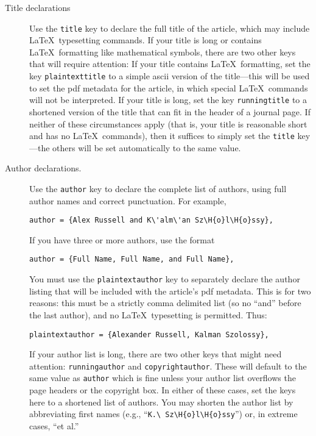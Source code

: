 \documentclass{article}
\theoremstyle{plain}
\theoremstyle{definition}
\begin{document}
\begin{description}
\item[Title declarations] Use the \lstinline`title` key to declare the full title of the article, which may include \LaTeX\ typesetting commands. If your title is long or contains \LaTeX\ formatting like mathematical symbols, there are two other keys that will require attention: If your title contains \LaTeX\ formatting, set the key \lstinline`plaintexttitle` to a simple ascii version of the title---this will be used to set the pdf metadata for the article, in which special \LaTeX\ commands will not be interpreted. If your title is long, set the key \lstinline`runningtitle` to a shortened version of the title that can fit in the header of a journal page. If neither of these circumstances apply (that is, your title is reasonable short and has no \LaTeX\ commands), then it suffices to simply set the \lstinline`title` key---the others will be set automatically to the same value.

\item[Author declarations.] Use the \lstinline`author` key to declare the complete list of authors, using full author names and correct punctuation. For example,
\begin{lstlisting}
author = {Alex Russell and K\'alm\'an Sz\H{o}l\H{o}ssy},
\end{lstlisting}
If you have three or more authors, use the format
\begin{lstlisting}
author = {Full Name, Full Name, and Full Name},
\end{lstlisting}
You must use the \lstinline`plaintextauthor` key to separately declare the author listing that will be included with the article's pdf metadata. This is for two reasons: this must be a strictly comma delimited list (so no ``and'' before the last author), and no \LaTeX\ typesetting is permitted. Thus:
\begin{lstlisting}
plaintextauthor = {Alexander Russell, Kalman Szolossy},
\end{lstlisting}
If your author list is long, there are two other keys that might need attention: \lstinline'runningauthor' and \lstinline'copyrightauthor'. These will default to the same value as \lstinline'author' which is fine unless your author list overflows the page headers or the copyright box. In either of these cases, set the keys here to a shortened list of authors. You may shorten the author list by abbreviating first names (e.g., ``\lstinline`K.\ Sz\H{o}l\H{o}ssy`'') or, in extreme cases, ``et al.''


\end{description}
\end{document}
